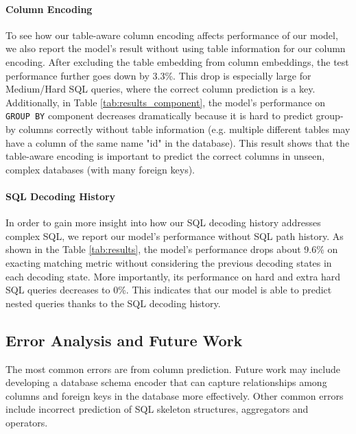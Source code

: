 \documentclass[11pt,a4paper]{article}
\begin{document}
\paragraph{Column Encoding}
To see how our table-aware column encoding affects performance of our model, we also report the model's result without using table information for our column encoding. After excluding the table embedding from column embeddings, the test performance further goes down by 3.3\%. 
This drop is especially large for Medium/Hard SQL queries, where the correct column prediction is a key.
Additionally, in Table \ref{tab:results_component}, the model's performance on \texttt{GROUP BY} component decreases dramatically because it is hard to predict group-by columns correctly without table information (e.g. multiple different tables may have a column of the same name "id" in the database).
This result shows that the table-aware encoding is important to predict the correct columns in unseen, complex databases (with many foreign keys).

\paragraph{SQL Decoding History}
In order to gain more insight into how our SQL decoding history addresses complex SQL, we report our model's performance without SQL path history.
As shown in the Table \ref{tab:results}, the model's performance drops about 9.6\% on exacting matching metric without considering the previous decoding states in each decoding state. More importantly, its performance on hard and extra hard SQL queries decreases to 0\%. This indicates that our model is able to predict nested queries thanks to the SQL decoding history.

\subsection{Error Analysis and Future Work}
The most common errors are from column prediction. Future work may include developing a database schema encoder that can capture relationships among columns and foreign keys in the database more effectively. Other common errors include incorrect prediction of SQL skeleton structures, aggregators and operators. 
\end{document}
